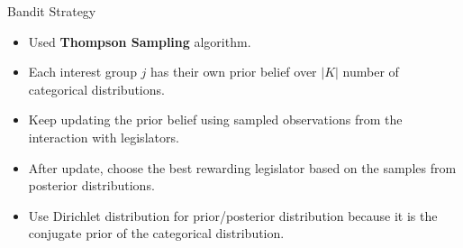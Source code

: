 \documentclass{beamer}
\begin{document}
	\begin{frame}{Bandit Strategy}
		\fontsize{13pt}{12pt}

		\begin{itemize}
			\item Used \textbf{Thompson Sampling} algorithm.
				\item Each interest group $j$ has their own prior belief over $|K|$ number of categorical distributions.
				\item Keep updating the prior belief using sampled observations from the interaction with legislators.
				\item After update, choose the best rewarding legislator 
				based on the samples from posterior distributions. %
				\item Use Dirichlet distribution for prior/posterior distribution because it is the conjugate prior of the categorical distribution.

	
		\end{itemize}
	\end{frame}
\end{document}
